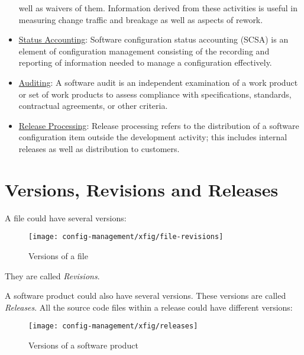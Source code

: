 \begin{itemize}
  well as waivers of them. Information derived from these activities
  is useful in measuring change traffic and breakage as well as aspects
  of rework.
\item \underline{Status Accounting}:
  Software configuration status
  accounting (SCSA) is an element of configuration management
  consisting of the recording and reporting of information needed to
  manage a configuration effectively.
\item \underline{Auditing}:
  A software audit is an independent examination of a work product or set
  of work products to assess compliance with specifications, standards,
  contractual agreements, or other criteria.
\item \underline{Release Processing}:
  Release processing refers to the distribution of a software
  configuration item outside the development activity; this includes
  internal releases as well as distribution to customers.
\end{itemize}
\section{Versions, Revisions and Releases}
A file could have several versions:
\begin{figure}[H]
\begin{center}
\texttt{[image: config-management/xfig/file-revisions]}
\end{center}
\caption{Versions of a file}
\end{figure}
They are called \emph{Revisions}.

\ifslides
\else
A software product could also have several versions. These
versions are called \emph{Releases}. All the source code files
within a release could have different versions:

\fi
\begin{figure}[H]
\begin{center}
\texttt{[image: config-management/xfig/releases]}
\end{center}
\caption{Versions of a software product}
\end{figure}
\newslide

